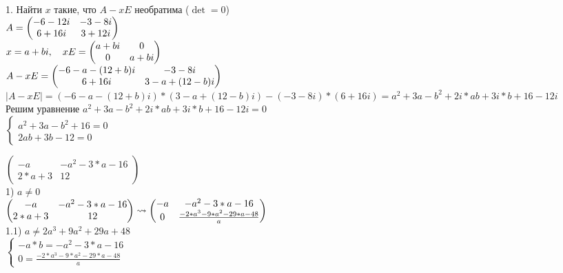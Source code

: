 \documentclass[12pt, a4paper]{article}
\begin{document}
	1. Найти $x$ такие, что $A - xE$ необратима ($\det = 0$) \\
	
	$A = \begin{pmatrix} -6 - 12i & -3 -8i \\6 + 16i & 3 + 12i \end{pmatrix}$ \\
	
	$x = a + bi, \quad xE = \begin{pmatrix} a + bi & 0 \\0 & a + bi \end{pmatrix}$\\
	
	$A - xE = \begin{pmatrix} -6-a - (12+b)i & -3 - 8i \\6 + 16i & 3 - a + (12 - b)i \end{pmatrix}$ \\
	
	$|A - xE| = (-6-a -(12+b)i) * (3 - a + (12 - b)i) - (-3 - 8i) * (6 + 16i) = a^2 + 3a - b^2 + 2i * ab + 3i * b + 16 - 12i$ \\
	
	Решим уравнение $a^2 + 3a - b^2 + 2i * ab + 3i * b + 16 - 12i = 0$ \\
	
	$\begin{cases}
		a^2 + 3a - b ^ 2 + 16 = 0 \\
		2ab + 3b - 12 = 0
	 \end{cases}
	 $
	 \sspace
	 
	 $\left(\begin{matrix}
	 	-a & -a^2-3*a-16 \\
	 	2*a+3 & 12
	 \end{matrix}\right)$ \\
	 
	 1) $a \neq 0$ \\
	 
	 $
	 \left(\begin{matrix}
	 	-a & -a^2-3*a-16 \\
	 	2*a+3 & 12
	 \end{matrix}\right)
	 \rightsquigarrow
	 \left(\begin{matrix}
	 	-a & -a^2-3*a-16 \\
	 	0 & \frac{-2*a^3-9*a^2-29*a-48}{a}
	 \end{matrix}\right) \\
	 $\\
	 
	 1.1) $a \neq 2a^3 + 9a^2 + 29a + 48$\\
	 
	 $
	 \begin{cases}
 		-a*b = -a^2-3*a-16 \\
 		0 = \frac{-2*a^3-9*a^2-29*a-48}{a}
	 \end{cases}
	 $ \\
	 
\end{document}
